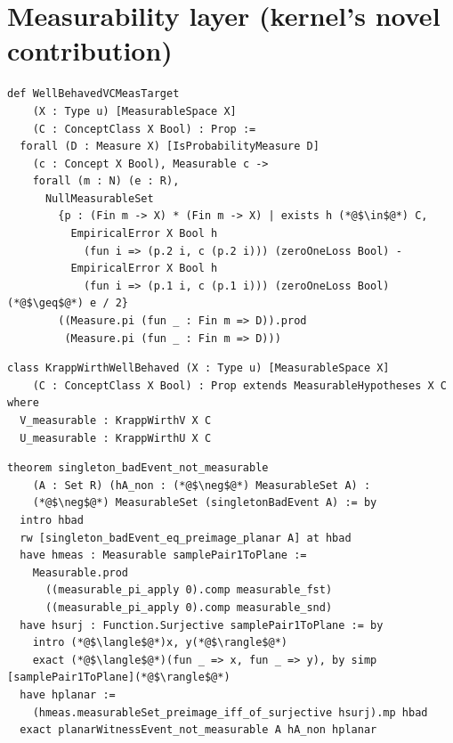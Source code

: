 \section{Measurability layer (kernel's novel contribution)}

\begin{lstlisting}[caption={WellBehavedVCMeasTarget (Complexity/Measurability.lean:388)}]
def WellBehavedVCMeasTarget
    (X : Type u) [MeasurableSpace X]
    (C : ConceptClass X Bool) : Prop :=
  forall (D : Measure X) [IsProbabilityMeasure D]
    (c : Concept X Bool), Measurable c ->
    forall (m : N) (e : R),
      NullMeasurableSet
        {p : (Fin m -> X) * (Fin m -> X) | exists h (*@$\in$@*) C,
          EmpiricalError X Bool h
            (fun i => (p.2 i, c (p.2 i))) (zeroOneLoss Bool) -
          EmpiricalError X Bool h
            (fun i => (p.1 i, c (p.1 i))) (zeroOneLoss Bool) (*@$\geq$@*) e / 2}
        ((Measure.pi (fun _ : Fin m => D)).prod
         (Measure.pi (fun _ : Fin m => D)))
\end{lstlisting}

\begin{lstlisting}[caption={KrappWirthWellBehaved (Complexity/Measurability.lean:241)}]
class KrappWirthWellBehaved (X : Type u) [MeasurableSpace X]
    (C : ConceptClass X Bool) : Prop extends MeasurableHypotheses X C where
  V_measurable : KrappWirthV X C
  U_measurable : KrappWirthU X C
\end{lstlisting}

\begin{lstlisting}[caption={Borel-analytic separation witness (Theorem/BorelAnalyticSeparation.lean:207)}]
theorem singleton_badEvent_not_measurable
    (A : Set R) (hA_non : (*@$\neg$@*) MeasurableSet A) :
    (*@$\neg$@*) MeasurableSet (singletonBadEvent A) := by
  intro hbad
  rw [singleton_badEvent_eq_preimage_planar A] at hbad
  have hmeas : Measurable samplePair1ToPlane :=
    Measurable.prod
      ((measurable_pi_apply 0).comp measurable_fst)
      ((measurable_pi_apply 0).comp measurable_snd)
  have hsurj : Function.Surjective samplePair1ToPlane := by
    intro (*@$\langle$@*)x, y(*@$\rangle$@*)
    exact (*@$\langle$@*)(fun _ => x, fun _ => y), by simp [samplePair1ToPlane](*@$\rangle$@*)
  have hplanar :=
    (hmeas.measurableSet_preimage_iff_of_surjective hsurj).mp hbad
  exact planarWitnessEvent_not_measurable A hA_non hplanar
\end{lstlisting}

